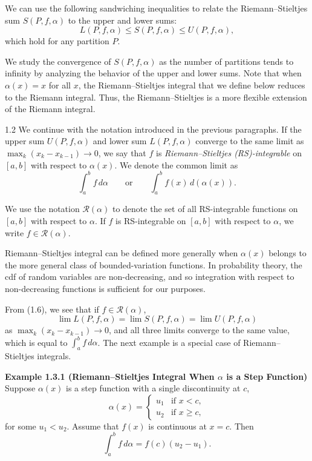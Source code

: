 We can use the following sandwiching inequalities to relate the Riemann--Stieltjes sum $S(P,f,\alpha)$ to the upper and lower sums:
\begin{equation}
L(P,f,\alpha)\le S(P,f,\alpha)\le U(P,f,\alpha),
\tag{1.6}
\end{equation}
which hold for any partition $P$.

We study the convergence of $S(P,f,\alpha)$ as the number of partitions tends to infinity by analyzing the behavior of the upper and lower sums. Note that when $\alpha(x)=x$ for all $x$, the Riemann--Stieltjes integral that we define below reduces to the Riemann integral. Thus, the Riemann--Stieltjes is a more flexible extension of the Riemann integral.

\begin{defbox}{1.2}
We continue with the notation introduced in the previous paragraphs. If the upper sum $U(P,f,\alpha)$ and lower sum $L(P,f,\alpha)$ converge to the same limit as $\max_k (x_k-x_{k-1})\to 0$, we say that $f$ is \textit{Riemann--Stieltjes (RS)-integrable} on $[a,b]$ with respect to $\alpha(x)$. We denote the common limit as
\[
\int_a^b f\, d\alpha
\qquad \text{or} \qquad
\int_a^b f(x)\, d(\alpha(x)).
\]

We use the notation $\mathcal{R}(\alpha)$ to denote the set of all RS-integrable functions on $[a,b]$ with respect to $\alpha$. If $f$ is RS-integrable on $[a,b]$ with respect to $\alpha$, we write $f\in \mathcal{R}(\alpha)$.
\end{defbox}

Riemann--Stieltjes integral can be defined more generally when $\alpha(x)$ belongs to the more general class of bounded-variation functions. In probability theory, the cdf of random variables are non-decreasing, and so integration with respect to non-decreasing functions is sufficient for our purposes.

From (1.6), we see that if $f\in \mathcal{R}(\alpha)$,
\[
\lim L(P,f,\alpha)=\lim S(P,f,\alpha)=\lim U(P,f,\alpha)
\]
as $\max_k(x_k-x_{k-1})\to 0$, and all three limits converge to the same value, which is equal to $\int_a^b f\, d\alpha$. The next example is a special case of Riemann--Stieltjes integrals.

\textbf{Example 1.3.1 (Riemann--Stieltjes Integral When $\alpha$ is a Step Function)} \\
Suppose $\alpha(x)$ is a step function with a single discontinuity at $c$,
\[
\alpha(x)=
\begin{cases}
u_1 & \text{if } x<c,\\
u_2 & \text{if } x\ge c,
\end{cases}
\]
for some $u_1<u_2$. Assume that $f(x)$ is continuous at $x=c$. Then
\[
\int_a^b f\, d\alpha = f(c)(u_2-u_1).
\]


